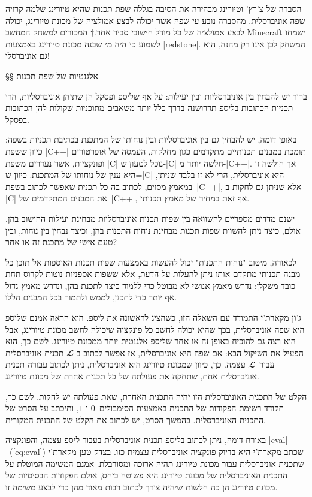 הסברה של צ'רץ' וטיורינג מבהירה את הסיבה בגללה שפת תכנות שהיא טיורינג שלמה קרויה
שפה אוניברסלית. מהסברה נובע עי שפה אשר יכולה לבצע אמולציה של מכונת טיורינג,
יכולה לבצע אמולציה של כל מודל חישובי סביר אחר.†{%
  המכורים למשחק המחשב Minecraft ישמחו לשמוע כי היה מי שבנה מכונת טיורינג
  באמצעות \E|redstone|. המשחק לכן אינו רק מהנה, הוא גם אוניברסלי!}

§§ אלגנטיות של שפת תכנות

ברור יש להבחין בין אוניברסליות ובין יעילות: על אף שליספ ופסקל הן שתיהן
אוניברסליות, הרי תכניות הכתובות בליספ תדרושנה בדרך כלל יותר משאבים מתוכניות
שקולות להן הכתובות בפסקל.

באופן דומה, יש להבחין גם בין אוניברסליות ובין נוחותו של המתכנת בכתיבת תכניות
בשפה: כיוון ששפת \E|C++| תומכת במבנים תכנותיים מתקדמים כגון מחלקות, העמסה של
אופרטורים ופונקציות, אשר נעדרים משפת \E|C| נוכל לטעון ש-\E|C| חלשה יותר
מ-\E|C++|. אך חולשה זו היא ענין של נוחותו של המתכנת. כיוון ש=\E|C| היא
אוניברסלית, הרי לא זו בלבד שניתן, במאמץ מסוים, לכתוב בה כל תכנית שאפשר לכתוב
בשפת~\E|C++|, אלא שניתן גם לחקות ב-\E|C| את המבנים המתקדמים של~\E|C++|, אף זאת
במחיר של מאמץ תכנותי.

ישנם מדדים מספריים להשוואה בין שפות תכנות אוניברסליות מבחינת יעילות החישוב בהן.
אולם, כיצד ניתן להשוות שפות תכנות מבחינת נוחות התכנות בהן, וכיצד נבחין בין
נוחות, ובין טעם אישי של מתכנת זה או אחר?

לכאורה, מיטוב "נוחות התכנות" יכול להעשות באמצעות שפות תכנות האוספות אל תוכן כל
מבנה תכנותי מתקדם אותו ניתן להעלות על הדעת, אלא ששפות אספניות נוטות לקרוס תחת
כובד משקלן: נדרש מאמץ אנושי לא מבוטל כדי ללמוד כיצד לתכנת בהן, ונדרש מאמץ גדול
אף יותר כדי לתכנן, לממש ולתמוך בכל המבנים הללו.

ג'ון מקארת'י התמודד עם השאלה הזו, כשהציג לראשונה את ליספ. הוא הראה אמנם שליספ
היא שפה אוניברסלית, בכך שהיא יכולה לחשב כל פונקציה שיכולה לחשב מכונת טיורינג,
אבל הוא רצה גם להוכיח באופן זה או אחר שליספ אלגנטית יותר ממכונת טיורינג. לשם
כך, הוא הפעיל את השיקול הבא: אם שפה היא אוניברסלית, אז אפשר לכתוב ב-$𝓛$ תכנית
אוניברסלית עבור~$𝓛$ עצמה. כך, כיוון שמכונת טיורינג היא אוניברסלית, ניתן לכתוב
עבורה תכנית אוניברסלית אחת, שתחקה את פעולתה של כל תכנית אחרת של מכונת טיורינג.

הקלט של התכנית האוניברסלית הזו יהיה התכנית האחרת, שאת פעולתה יש לחקות. לשם כך,
תקודד רשימת הפקודות של התכנית באמצעות הסימבולים~$0$ ו-$1$, ותיכתב על הסרט של
התכנית האוניברסלית. בהמשך הסרט, יש לכתוב את הקלט של התכנית המקורית.

באורח דומה, ניתן לכתוב בליספ תכנית אוניברסלית בעבור ליספ עצמה, והפונקציה
\E|eval|~(\ref{eq:eval}) שכתב מקארת'י היא בדיוק פונקציה אוניברסלית עצמית כזו.
בצדק טען מקארת'י שתכנית אוניברסלית עבור מכונת טיורינג תהיה ארוכה ומסורבלת.
אמנם המשימה המוטלת על התכנית האוניברסלית של מכונת טיורינג היא פשוטה ביחס, אולם
הפקודות הבסיסיות של מכונת טיורינג הן כה חלשות שיהיה צורך לכתוב רבות מאוד מהן
כדי לבצע משימה זו.

